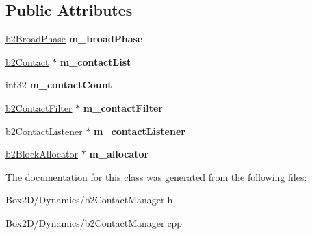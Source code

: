 \subsection*{Public Attributes}
\begin{DoxyCompactItemize}
\item 
\mbox{\label{classb2_contact_manager_af85a9c7b0fb138b9fb635dbcf3b0b482}} 
\hyperlink{classb2_broad_phase}{b2\+Broad\+Phase} {\bfseries m\+\_\+broad\+Phase}
\item 
\mbox{\label{classb2_contact_manager_aaca5f490daffabd29f7ad809921224b3}} 
\hyperlink{classb2_contact}{b2\+Contact} $\ast$ {\bfseries m\+\_\+contact\+List}
\item 
\mbox{\label{classb2_contact_manager_a115b2f9bf38ffd045b26ae91ea696288}} 
int32 {\bfseries m\+\_\+contact\+Count}
\item 
\mbox{\label{classb2_contact_manager_accf0e9232b9eeff002220ecb8d37a17f}} 
\hyperlink{classb2_contact_filter}{b2\+Contact\+Filter} $\ast$ {\bfseries m\+\_\+contact\+Filter}
\item 
\mbox{\label{classb2_contact_manager_ac3565501f5ab42323050712b244bfe9a}} 
\hyperlink{classb2_contact_listener}{b2\+Contact\+Listener} $\ast$ {\bfseries m\+\_\+contact\+Listener}
\item 
\mbox{\label{classb2_contact_manager_a20c57f602aa349239df715de5294821d}} 
\hyperlink{classb2_block_allocator}{b2\+Block\+Allocator} $\ast$ {\bfseries m\+\_\+allocator}
\end{DoxyCompactItemize}


The documentation for this class was generated from the following files\+:\begin{DoxyCompactItemize}
\item 
Box2\+D/\+Dynamics/b2\+Contact\+Manager.\+h\item 
Box2\+D/\+Dynamics/b2\+Contact\+Manager.\+cpp\end{DoxyCompactItemize}
